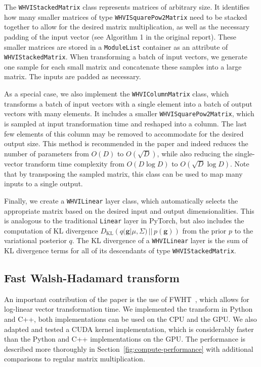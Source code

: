 The \texttt{WHVIStackedMatrix} class represents matrices of arbitrary size.
It identifies how many smaller matrices of type \texttt{WHVISquarePow2Matrix} need to be stacked together to allow for the desired matrix multiplication, as well as the necessary padding of the input vector (see Algorithm 1 in the original report).
These smaller matrices are stored in a \texttt{ModuleList} container as an attribute of \texttt{WHVIStackedMatrix}.
When transforming a batch of input vectors, we generate one sample for each small matrix and concatenate these samples into a large matrix.
The inputs are padded as necessary.

As a special case, we also implement the \texttt{WHVIColumnMatrix} class, which transforms a batch of input vectors with a single element into a batch of output vectors with many elements.
It includes a smaller \texttt{WHVISquarePow2Matrix}, which is sampled at input transformation time and reshaped into a column.
The last few elements of this column may be removed to accommodate for the desired output size.
This method is recommended in the paper and indeed reduces the number of parameters from $O(D)$ to $O(\sqrt{D})$, while also reducing the single-vector transform time complexity from $O(D\log D)$ to $O(\sqrt{D}\log D)$.
Note that by transposing the sampled matrix, this class can be used to map many inputs to a single output.

Finally, we create a \texttt{WHVILinear} layer class, which automatically selects the appropriate matrix based on the desired input and output dimensionalities.
This is analogous to the traditional \texttt{Linear} layer in PyTorch, but also includes the computation of KL divergence $D_\mathrm{KL}\left(q(\mathbf{g}|\mu, \Sigma)\, ||\, p(\mathbf{g})\right)$ from the prior $p$ to the variational posterior $q$.
The KL divergence of a \texttt{WHVILinear} layer is the sum of KL divergence terms for all of its descendants of type \texttt{WHVIStackedMatrix}.

\subsection{Fast Walsh-Hadamard transform}\label{subsec:fast-walsh-hadamard-transform}
An important contribution of the paper is the use of FWHT~\cite{fino1976unified}, which allows for log-linear vector transformation time.
We implemented the transform in Python and C++, both implementations can be used on the CPU and the GPU\@.
We also adapted and tested a CUDA kernel implementation, which is considerably faster than the Python and C++ implementations on the GPU\@.
The performance is described more thoroughly in Section~\ref{fig:compute-performance} with additional comparisons to regular matrix multiplication.

